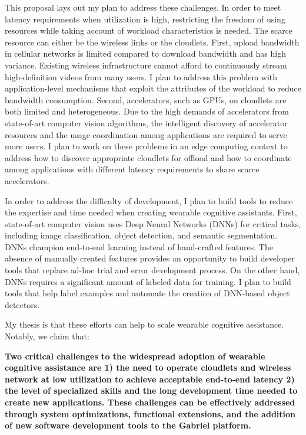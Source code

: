 This proposal lays out my plan to address these challenges. In order to meet
latency requirements when utilization is high, restricting the freedom of using
resources while taking account of workload characteristics is needed. The scarce
resource can either be the wireless links or the cloudlets. First, upload
bandwidth in cellular networks is limited compared to download bandwidth and has
high variance. Existing wireless infrastructure cannot afford to continuously
stream high-definition videos from many users. I plan to address this problem
with application-level mechanisms that exploit the attributes of the workload to
reduce bandwidth consumption. Second, accelerators, such as GPUs, on cloudlets
are both limited and heterogeneous. Due to the high demands of accelerators from
state-of-art computer vision algorithms, the intelligent discovery of
accelerator resources and the usage coordination among applications are required to
serve more users. I plan to work on these problems in an edge computing context
to address how to discover appropriate cloudlets for offload and how to
coordinate among applications with different latency requirements to share
scarce accelerators.

In order to address the difficulty of development, I plan to build tools to
reduce the expertise and time needed when creating wearable cognitive
assistants. First, state-of-art computer vision uses Deep Neural Networks (DNNs)
for critical tasks, including image classification, object detection, and
semantic segmentation. DNNs champion end-to-end learning instead of hand-crafted
features. The absence of manually created features provides an opportunity to
build developer tools that replace ad-hoc trial and error development process.
On the other hand, DNNs requires a significant amount of labeled data for training. I
plan to build tools that help label examples and automate the creation of
DNN-based object detectors.

My thesis is that these efforts can help to scale wearable cognitive assistance.
Notably, we claim that:

\textbf{Two critical challenges to the widespread adoption of wearable cognitive
  assistance are 1) the need to operate cloudlets and wireless network at low
  utilization to achieve acceptable end-to-end latency 2) the level of specialized
  skills and the long development time needed to create new applications. These
  challenges can be effectively addressed through system optimizations,
  functional extensions, and the addition of new software development tools to
  the Gabriel platform.}

